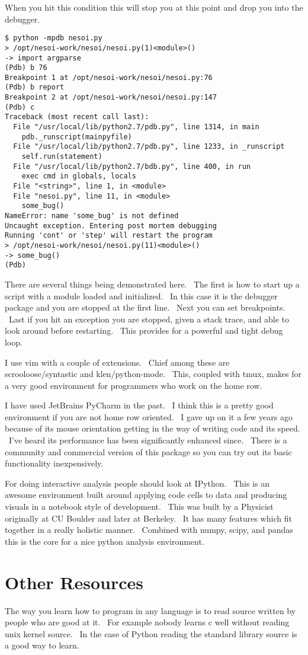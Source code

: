 \documentclass[]{article}
\begin{document}
When you hit this condition this will stop you at this point and drop
you into the debugger.

\begin{verbatim}
$ python -mpdb nesoi.py
> /opt/nesoi-work/nesoi/nesoi.py(1)<module>()
-> import argparse
(Pdb) b 76
Breakpoint 1 at /opt/nesoi-work/nesoi/nesoi.py:76
(Pdb) b report
Breakpoint 2 at /opt/nesoi-work/nesoi/nesoi.py:147
(Pdb) c
Traceback (most recent call last):
  File "/usr/local/lib/python2.7/pdb.py", line 1314, in main
    pdb._runscript(mainpyfile)
  File "/usr/local/lib/python2.7/pdb.py", line 1233, in _runscript
    self.run(statement)
  File "/usr/local/lib/python2.7/bdb.py", line 400, in run
    exec cmd in globals, locals
  File "<string>", line 1, in <module>
  File "nesoi.py", line 11, in <module>
    some_bug()
NameError: name 'some_bug' is not defined
Uncaught exception. Entering post mortem debugging
Running 'cont' or 'step' will restart the program
> /opt/nesoi-work/nesoi/nesoi.py(11)<module>()
-> some_bug()
(Pdb) 
\end{verbatim}

There are several things being demonstrated here. ~The first is how to
start up a script with a module loaded and initialized. ~In this case it
is the debugger package and you are stopped at the first line. ~Next you
can set breakpoints. ~Last if you hit an exception you are stopped,
given a stack trace, and able to look around before restarting. ~This
provides for a powerful and tight debug loop.

I use vim with a couple of extensions. ~Chief among these are
scrooloose/syntastic and klen/python-mode. ~This, coupled with tmux,
makes for a very good environment for programmers who work on the home
row.

I have used JetBrains PyCharm in the past. ~I think this is a pretty
good environment if you are not home row oriented. ~I gave up on it a
few years ago because of its mouse orientation getting in the way of
writing code and its speed. ~I've heard its performance has been
significantly enhanced since. ~There is a community and commercial
version of this package so you can try out its basic functionality
inexpensively.

For doing interactive analysis people should look at IPython. ~This is
an awesome environment built around applying code cells to data and
producing visuals in a notebook style of development. ~This was built by
a Physicist originally at CU Boulder and later at Berkeley. ~It has many
features which fit together in a really holistic manner. ~Combined with
numpy, scipy, and pandas this is the core for a nice python analysis
environment.

\section{Other Resources}

The way you learn how to program in any language is to read source
written by people who are good at it. ~For example nobody learns c well
without reading unix kernel source. ~In the case of Python reading the
standard library source is a good way to learn.
\end{document}
